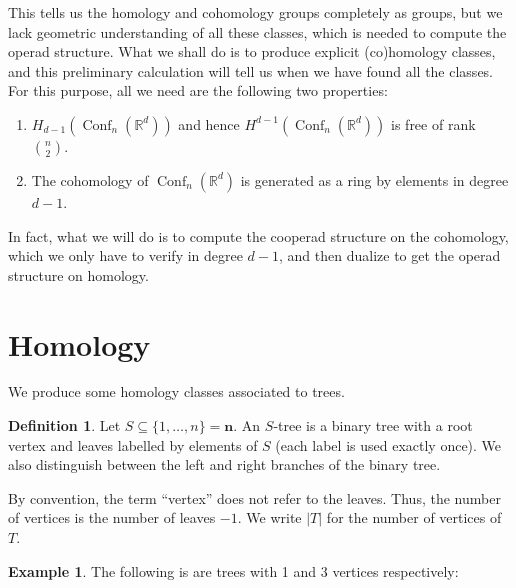 \documentclass{shortart}
\theoremstyle{definition}
\newtheorem{defi}[thm]{Definition}
\newtheorem{eg}[thm]{Example}
\DeclareMathOperator\Conf{Conf}
\newcommand\R{\mathbb{R}}
\begin{document}
This tells us the homology and cohomology groups completely as groups, but we lack geometric understanding of all these classes, which is needed to compute the operad structure. What we shall do is to produce explicit (co)homology classes, and this preliminary calculation will tell us when we have found all the classes. For this purpose, all we need are the following two properties:
\begin{enumerate}
  \item $H_{d - 1}(\Conf_n(\R^d))$ and hence $H^{d - 1}(\Conf_n(\R^d))$ is free of rank $\binom{n}{2}$.
  \item The cohomology of $\Conf_n(\R^d)$ is generated as a ring by elements in degree $d - 1$.
\end{enumerate}

In fact, what we will do is to compute the cooperad structure on the cohomology, which we only have to verify in degree $d - 1$, and then dualize to get the operad structure on homology.

\section{Homology}
We produce some homology classes associated to trees.
\begin{defi}
  Let $S \subseteq \{1, \ldots, n\} = \mathbf{n}$. An $S$-tree is a binary tree with a root vertex and leaves labelled by elements of $S$ (each label is used exactly once). We also distinguish between the left and right branches of the binary tree.

  By convention, the term ``vertex'' does not refer to the leaves. Thus, the number of vertices is the number of leaves $ - 1$. We write $|T|$ for the number of vertices of $T$.
\end{defi}

\begin{eg}
  The following is are trees with 1 and 3 vertices respectively:
  \begin{center}
  \end{center}
\end{eg}
\end{document}
